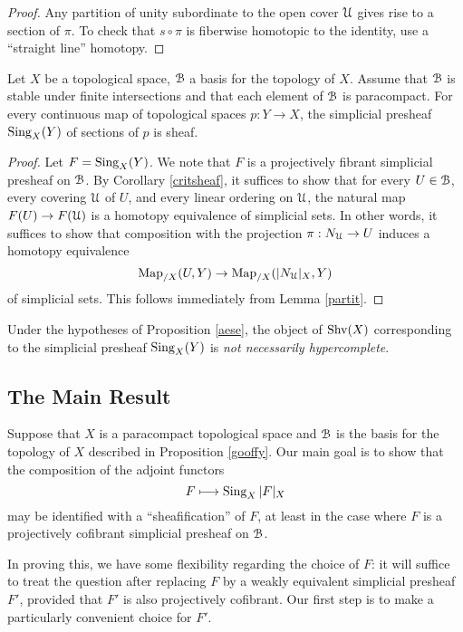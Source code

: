 \begin{proof}
Any partition of unity subordinate to the open cover $\operatorname{\mathcal{U}}$ gives rise to a section of $\pi$. 
To check that $s \circ \pi$ is fiberwise homotopic to the identity, use a ``straight line'' homotopy.
\end{proof}

\begin{proposition}\label{aese}
Let $X$ be a topological space, $\operatorname{\mathcal{B}}$ a basis for the topology of $X$. Assume that $\operatorname{\mathcal{B}}$ is stable under finite intersections and that each element of $\operatorname{\mathcal{B}}$ is paracompact. For
every continuous map of topological spaces $p: Y \rightarrow X$, the simplicial presheaf $\operatorname{Sing}_{X}(Y)$ of sections of $p$ is sheaf.
\end{proposition}

\begin{proof}
Let $F = \operatorname{Sing}_{X}(Y)$. We note that $F$ is a projectively fibrant simplicial presheaf on $\operatorname{\mathcal{B}}$.
By Corollary \ref{critsheaf}, it suffices to show that for every $U \in \operatorname{\mathcal{B}}$,
every covering $\operatorname{\mathcal{U}}$ of $U$, and every linear ordering on $\operatorname{\mathcal{U}}$, 
the natural map $F(U) \rightarrow F(\operatorname{\mathcal{U}})$ is a homotopy equivalence of simplicial sets. In other words, it suffices to show that composition with the projection $\pi: N_{\operatorname{\mathcal{U}}} \rightarrow U$ induces a homotopy equivalence
$$ \operatorname{{Map}}_{/X}( U, Y ) \rightarrow \operatorname{{Map}}_{/X}( |N_{\operatorname{\mathcal{U}}}|_{X}, Y)$$
of simplicial sets. This follows immediately from Lemma \ref{partit}.
\end{proof}

\begin{remark}
Under the hypotheses of Proposition \ref{aese}, the object of $\operatorname{Shv}(X)$ corresponding
to the simplicial presheaf $\operatorname{Sing}_{X}(Y)$ is {\em not necessarily hypercomplete}. 
\end{remark}

\subsection{The Main Result}\label{para3}

Suppose that $X$ is a paracompact topological space and $\operatorname{\mathcal{B}}$ is the basis for the topology of $X$ described in Proposition \ref{gooffy}. Our main goal is to show that the composition of the adjoint functors
$$ F \longmapsto \operatorname{Sing}_{X} |F|_{X}$$ may be identified with a ``sheafification'' of $F$, at least in the case where $F$ is a projectively cofibrant simplicial presheaf on $\operatorname{\mathcal{B}}$. 

In proving this, we have some flexibility regarding the choice of $F$: it will suffice to treat the question after replacing $F$ by a weakly equivalent simplicial presheaf $F'$, provided that $F'$ is also projectively cofibrant. Our first step is to make a particularly convenient choice for $F'$.

